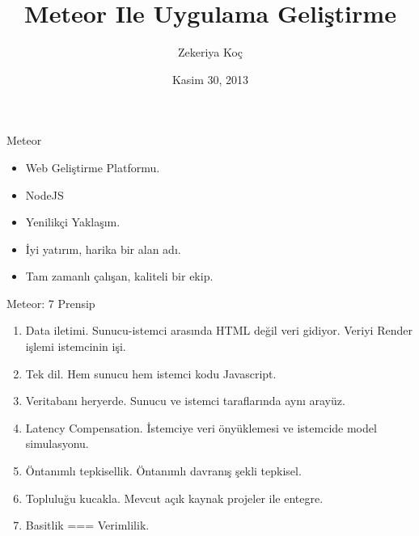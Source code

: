 \documentclass{beamer}
\title[Meteor 101]{Meteor Ile Uygulama Geliştirme}
\author{Zekeriya Koç}
\institute{Metglobal}
\date{Kasim 30, 2013}
\begin{document}
    \begin{frame}
        \titlepage{}
    \end{frame}

    \begin{frame}{Meteor}
        \begin{itemize}
            \item Web Geliştirme Platformu.
            \item NodeJS
            \item Yenilikçi Yaklaşım.
            \item İyi yatırım, harika bir alan adı.
            \item Tam zamanlı çalışan, kaliteli bir ekip.
        \end{itemize}
    \end{frame}

    \begin{frame}{Meteor: 7 Prensip}
        \begin{enumerate}
            \item Data iletimi. Sunucu-istemci arasında HTML değil veri gidiyor. Veriyi Render işlemi istemcinin işi.
            \item Tek dil. Hem sunucu hem istemci kodu Javascript.
            \item Veritabanı heryerde. Sunucu ve istemci taraflarında aynı arayüz.
            \item Latency Compensation. İstemciye veri önyüklemesi ve istemcide model simulasyonu.
            \item Öntanımlı tepkisellik. Öntanımlı davranış şekli tepkisel.
            \item Topluluğu kucakla. Mevcut açık kaynak projeler ile entegre.
            \item Basitlik === Verimlilik.
        \end{enumerate}
    \end{frame}
\end{document}
